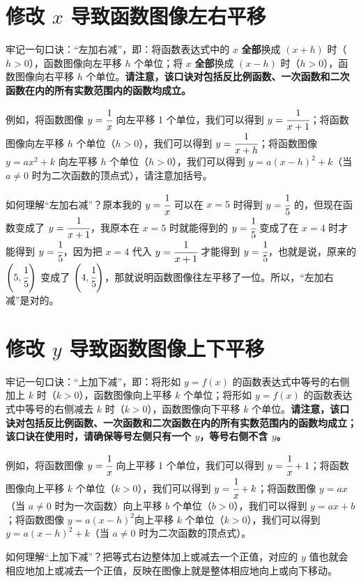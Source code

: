 \documentclass[a4paper]{article}
\begin{document}
\section{修改 $x$ 导致函数图像左右平移}

牢记一句口诀：“左加右减”，即：将函数表达式中的 $x$ \textbf{全部}换成 $(x + h)$ 时（$h > 0$），函数图像向左平移 $h$ 个单位；将 $x$ \textbf{全部}换成 $(x - h)$ 时（$h > 0$），函数图像向右平移 $h$ 个单位。\textbf{请注意，该口诀对包括反比例函数、一次函数和二次函数在内的所有实数范围内的函数均成立。}

例如，将函数图像 $y = \cfrac{1}{x}$ 向左平移 1 个单位，我们可以得到 $y = \cfrac{1}{x + 1}$；将函数图像向左平移 $h$ 个单位（$h > 0$），我们可以得到 $y = \cfrac{1}{x + h}$；将函数图像 $y = ax^2 + k$ 向左平移 $h$ 个单位（$h > 0$），我们可以得到 $y = a(x - h)^2 + k$（当 $a \neq 0$ 时为二次函数的顶点式），请注意加括号。

如何理解“左加右减”？原本我的 $y = \cfrac{1}{x}$ 可以在 $x = 5$ 时得到 $y = \cfrac{1}{5}$ 的，但现在函数变成了 $y = \cfrac{1}{x + 1}$，我原本在 $x = 5$ 时就能得到的 $y = \cfrac{1}{5}$ 变成了在 $x = 4$ 时才能得到 $y = \cfrac{1}{5}$，因为把 $x = 4$ 代入 $y = \cfrac{1}{x + 1}$ 才能得到 $y = \cfrac{1}{5}$，也就是说，原来的 $\left(5, \cfrac{1}{5}\right)$ 变成了 $\left(4, \cfrac{1}{5}\right)$，那就说明函数图像往左平移了一位。所以，“左加右减”是对的。

\section{修改 $y$ 导致函数图像上下平移}

牢记一句口诀：“上加下减”，即：将形如 $y = f(x)$ 的函数表达式中等号的右侧加上 $k$ 时（$k > 0$），函数图像向上平移 $k$ 个单位；将形如 $y = f(x)$ 的函数表达式中等号的右侧减去 $k$ 时（$k > 0$），函数图像向下平移 $k$ 个单位。\textbf{请注意，该口诀对包括反比例函数、一次函数和二次函数在内的所有实数范围内的函数均成立；该口诀在使用时，请确保等号左侧只有一个 $y$，等号右侧不含 $y$。}

例如，将函数图像 $y = \cfrac{1}{x}$ 向上平移 1 个单位，我们可以得到 $y = \cfrac{1}{x} + 1$；将函数图像向上平移 $k$ 个单位（$k > 0$），我们可以得到 $y = \cfrac{1}{x} + k$；将函数图像 $y = ax$（当 $a \neq 0$ 时为一次函数）向上平移 $b$ 个单位（$b > 0$），我们可以得到 $y = ax + b$；将函数图像 $y = a(x - h)^2$向上平移 $k$ 个单位（$k > 0$），我们可以得到 $y = a(x - h)^2 + k$（当 $a \neq 0$ 时为二次函数的顶点式）。

如何理解“上加下减”？把等式右边整体加上或减去一个正值，对应的 $y$ 值也就会相应地加上或减去一个正值，反映在图像上就是整体相应地向上或向下移动。
\end{document}
